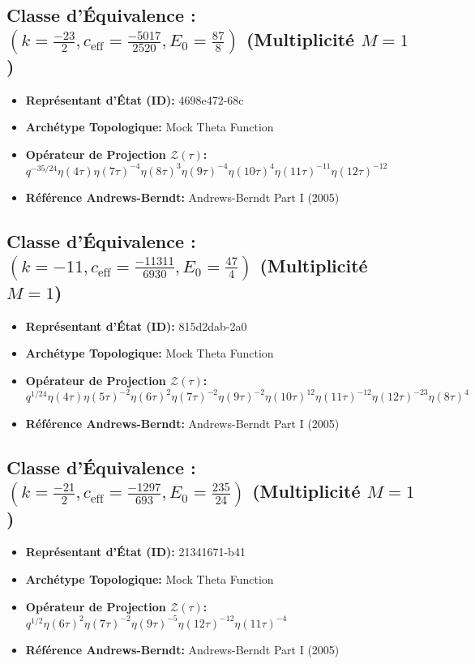 \documentclass[11pt,twoside,openright]{book}
\begin{document}
\subsection*{Classe d'Équivalence : $(k=\frac{-23}{2}, c_{\text{eff}}=\frac{-5017}{2520}, E_0=\frac{87}{8})$ (Multiplicité $M=1$)}
\begin{itemize}
  \item \textbf{Représentant d'État (ID):} 4698e472-68c
  \item \textbf{Archétype Topologique:} Mock Theta Function
  \item \textbf{Opérateur de Projection $\mathcal{Z}(\tau)$:} $q^{-35/24} \eta(4\tau) \eta(7\tau)^{-4} \eta(8\tau)^{3} \eta(9\tau)^{-4} \eta(10\tau)^{4} \eta(11\tau)^{-11} \eta(12\tau)^{-12}$
  \item \textbf{Référence Andrews-Berndt:} Andrews-Berndt Part I (2005)
\end{itemize}

\subsection*{Classe d'Équivalence : $(k=-11, c_{\text{eff}}=\frac{-11311}{6930}, E_0=\frac{47}{4})$ (Multiplicité $M=1$)}
\begin{itemize}
  \item \textbf{Représentant d'État (ID):} 815d2dab-2a0
  \item \textbf{Archétype Topologique:} Mock Theta Function
  \item \textbf{Opérateur de Projection $\mathcal{Z}(\tau)$:} $q^{1/24} \eta(4\tau) \eta(5\tau)^{-2} \eta(6\tau)^{2} \eta(7\tau)^{-2} \eta(9\tau)^{-2} \eta(10\tau)^{12} \eta(11\tau)^{-12} \eta(12\tau)^{-23} \eta(8\tau)^{4}$
  \item \textbf{Référence Andrews-Berndt:} Andrews-Berndt Part I (2005)
\end{itemize}

\subsection*{Classe d'Équivalence : $(k=\frac{-21}{2}, c_{\text{eff}}=\frac{-1297}{693}, E_0=\frac{235}{24})$ (Multiplicité $M=1$)}
\begin{itemize}
  \item \textbf{Représentant d'État (ID):} 21341671-b41
  \item \textbf{Archétype Topologique:} Mock Theta Function
  \item \textbf{Opérateur de Projection $\mathcal{Z}(\tau)$:} $q^{1/2} \eta(6\tau)^{2} \eta(7\tau)^{-2} \eta(9\tau)^{-5} \eta(12\tau)^{-12} \eta(11\tau)^{-4}$
  \item \textbf{Référence Andrews-Berndt:} Andrews-Berndt Part I (2005)
\end{itemize}
\end{document}
